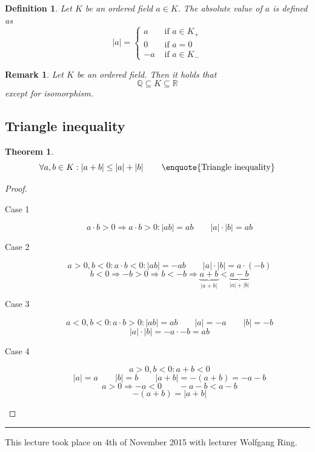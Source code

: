 \documentclass[a4paper,landscape,twocolumn]{article}
\newtheorem{theorem}{Theorem}
\newtheorem{defi}{Definition}
\newtheorem{rem}{Remark}
\newcommand\abs[1]{\left|#1\right|}
\newcommand\meta[3]{\hrule{} This #1 took place on #2 with lecturer #3.\par}
\begin{document}
\begin{defi}
  Let $K$ be an ordered field $a \in K$.
  The absolute value of $a$ is defined as
  \[
    \abs{a} = \begin{cases}
      a & \text{ if } a \in K_+ \\
      0 & \text{ if } a = 0 \\
      -a & \text{ if } a \in K_-
    \end{cases}
  \]
\end{defi}

\begin{rem}
  Let $K$ be an ordered field. Then it holds that
  \[ \mathbb{Q} \subseteq K \subseteq \mathbb{R} \]
  except for isomorphism.
\end{rem}

\subsection{Triangle inequality}
\begin{theorem}
  \[ \forall a, b \in K: \abs{a + b} \leq \abs{a} + \abs{b} \qquad \text{\enquote{Triangle inequality}} \]
\end{theorem}
\begin{proof}
  \begin{description}
    \item[Case 1]
      \[ a \cdot b > 0 \Rightarrow a \cdot b > 0: \abs{ab} = ab \qquad \abs{a}\cdot\abs{b} = ab \]
    \item[Case 2]
      \[ a > 0, b < 0: a \cdot b < 0: \abs{ab} = -ab \qquad \abs{a} \cdot \abs{b} = a \cdot (-b) \]
      \[ b < 0 \Rightarrow -b > 0 \Rightarrow b < -b \Rightarrow \underbrace{a + b}_{\abs{a + b}} < \underbrace{a - b}_{\abs{a} + \abs{b}} \]
    \item[Case 3]
      \[ a < 0, b < 0: a \cdot b > 0: \abs{ab} = ab \qquad \abs{a} = -a \qquad \abs{b} = -b  \]
      \[ \abs{a} \cdot \abs{b} = -a \cdot -b = a b \]
    \item[Case 4]
      \[ a > 0, b < 0: a + b < 0 \]
      \[ \abs{a} = a \qquad \abs{b} = b \qquad \abs{a + b} = -(a + b) = -a - b \]
      \[ a > 0 \Rightarrow -a < 0 \qquad -a - b < a - b \]
      \[ -(a + b) = \abs{a + b} \]
  \end{description}
\end{proof}

\meta{lecture}{4th of November 2015}{Wolfgang Ring}
\end{document}
